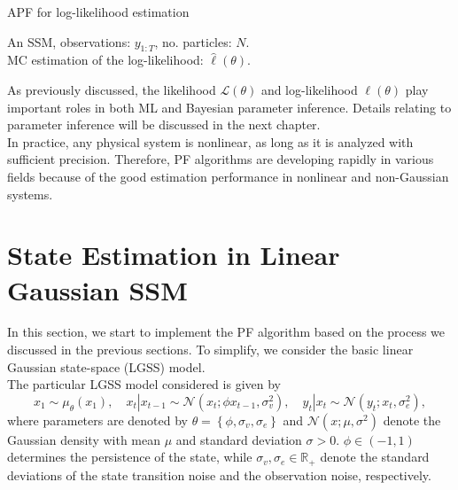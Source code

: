 \documentclass[mstat,12pt]{unswthesis}  %
\numberwithin{equation}{section}
\begin{document}
\begin{algorithm} [H] 
\caption{APF for log-likelihood estimation}  
\hspace*{0.02in}{\bf Input:}
An SSM, observations: $y_{1:T}$, no. particles: $N$.\\
\hspace*{0.02in}{\bf Output:} 
 MC estimation of the log-likelihood: $\widehat{\ell}(\theta)$.

\begin{algorithmic}[1] 
\end{algorithmic}  
\end{algorithm}

\noindent As previously discussed, the likelihood $\mathcal{L}(\theta)$ and log-likelihood $\ell(\theta)$ play important
roles in both ML and Bayesian parameter inference.
Details relating to
parameter inference  will be discussed in the next chapter. \\


\noindent In practice, any physical system is nonlinear,
as long as it is analyzed with sufficient precision.
Therefore, PF algorithms are developing rapidly in various fields because of the good  estimation performance in nonlinear and non-Gaussian systems.\\

\section{State Estimation in  Linear Gaussian SSM}
In this section, we start to implement the PF algorithm based on the process we discussed in the previous sections. To simplify, we consider the basic linear Gaussian state-space (LGSS) model.\\

\noindent The particular LGSS model considered is given by
\begin{equation}\label{lgss}
x_{1} \sim \mu_{\theta}\left(x_{1}\right), \quad x_{t}\left|x_{t-1} \sim \mathcal{N}\left(x_{t} ; \phi x_{t-1}, \sigma_{v}^{2}\right), \quad y_{t}\right| x_{t} \sim \mathcal{N}\left(y_{t} ; x_{t}, \sigma_{e}^{2}\right),\end{equation}
where parameters are denoted by
$\theta=\left\{\phi, \sigma_{v}, \sigma_{e}\right\}$
and $\mathcal{N}\left(x ; \mu, \sigma^{2}\right)$
denote the Gaussian density with
mean $\mu$ and standard deviation $\sigma > 0$.
$\phi \in(-1,1)$ determines the persistence
of the state, while $\sigma_{v}, \sigma_{e} \in \mathbb{R}_{+}$ denote the standard deviations of the state transition noise
and the observation noise, respectively.\\
\end{document}
